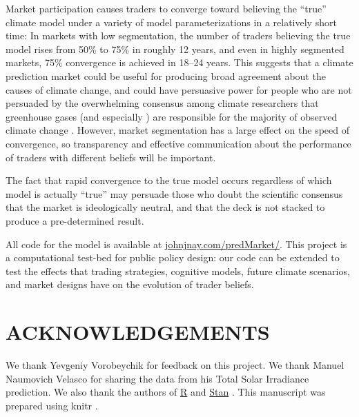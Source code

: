 \documentclass{wscpaperproc}\usepackage[]{graphicx}\usepackage[]{color}
\begin{document}
Market participation causes traders to converge toward believing the ``true'' climate model under a variety of model parameterizations in a relatively short time: In markets with low segmentation, the number of traders believing the true model rises from 50\% to 75\% in roughly 12 years, and even in highly segmented markets, 75\% convergence is achieved in 18--24 years. This suggests that a climate prediction market could be useful for producing broad agreement about the causes of climate change, and could have persuasive power for people who are not persuaded by the overwhelming consensus among climate researchers that greenhouse gases (and especially ) are responsible for the majority of observed climate change . However, market segmentation has a large effect on the speed of convergence, so transparency and effective communication about the performance of traders with different beliefs will be important.

The fact that rapid convergence to the true model occurs regardless of which model is actually ``true'' may persuade those who doubt the scientific consensus that the market is ideologically neutral, and that the deck is not stacked to produce a pre-determined result.

All code for the model is available at \href{http://johnjnay.com/predMarket/}{johnjnay.com/predMarket/}. This project is a computational test-bed for public policy design: our code can be extended to test the effects that trading strategies, cognitive models, future climate scenarios, and market designs have on the evolution of trader beliefs.

\section*{ACKNOWLEDGEMENTS}

We thank Yevgeniy Vorobeychik for feedback on this project. 
We thank Manuel Naumovich Velasco for sharing the data from his Total Solar Irradiance prediction.
We also thank the authors of \href{http://www.r-project.org}{\textsf{R}} 
and 
\href{http://mc-stan.org}{Stan} .
This manuscript was prepared using 
knitr .



\end{document}

